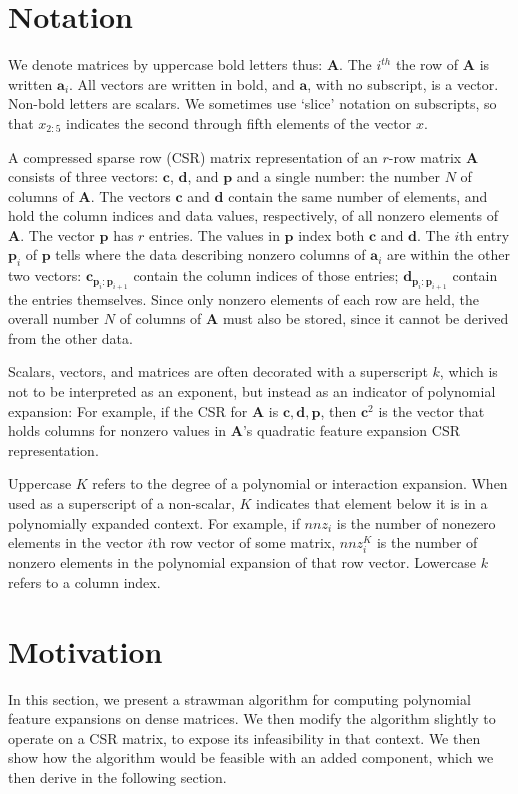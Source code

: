 \documentclass{article}
\begin{document}
\section{Notation}
We denote matrices by uppercase bold letters thus: $\bm{A}$. 
The $i^{th}$ the row of $\bm{A}$ is written $\bm{a}_i$. All vectors are written in bold, and  $\bm{a}$, with no subscript, is a vector. Non-bold letters are scalars. We sometimes use `slice' notation on subscripts, so that $x_{2:5}$ indicates the second through fifth elements of the vector $x$.

A compressed sparse row (CSR) matrix representation of an $r$-row matrix $\bm{A}$ consists of three vectors: $\bm{c}$, $\bm{d}$, and $\bm{p}$ and a single number: the number $N$ of columns of $\bm{A}$. The vectors
$\bm{c}$ and $\bm{d}$ contain the same number of elements, and hold the column indices and data values, respectively, of all nonzero elements of $\bm{A}$.
The vector $\bm{p}$ has $r$ entries. The values in $\bm{p}$ index both $\bm{c}$ and $\bm{d}$. The $i$th entry $\bm{p}_i$ of $\bm{p}$ tells where
the data describing nonzero columns of $\bm{a}_i$ are within the other two vectors: $\bm{c}_{\bm{p}_i:\bm{p}_{i+1}}$ contain the column indices of those entries; $\bm{d}_{\bm{p}_i:\bm{p}_{i+1}}$ contain the entries themselves.
Since only nonzero elements of each row are held, the overall number $N$ of columns of $\bm{A}$  must also be stored, since it cannot be derived
from the other data.

Scalars, vectors, and matrices are often decorated with a superscript $k$, which is not to be interpreted as an exponent, but instead as an indicator of polynomial expansion: 
For example, if the CSR for $\bm{A}$ is $\bm{c}, \bm{d}, \bm{p}$, then $\bm{c}^2$ is the vector that holds columns for nonzero values in $\bm{A}$'s quadratic feature expansion CSR representation.

Uppercase $K$ refers to the degree of a polynomial or interaction expansion.
When used as a superscript of a non-scalar, $K$ indicates that element below it is in a polynomially expanded context.
For example, if $nnz_i$ is the number of nonezero elements in the vector $i$th row vector of some matrix, $nnz_i^K$ is the number of nonzero elements in the polynomial expansion of that row vector.
Lowercase $k$ refers to a column index.

\section{Motivation}
In this section, we present a strawman algorithm for computing polynomial feature expansions on dense matrices.
We then modify the algorithm  slightly to operate on a CSR matrix, to expose its infeasibility in that context.
We then show how the algorithm would be feasible with an added component, which we then derive in the following section.
\end{document}
